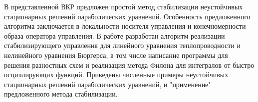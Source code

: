 \Conclusion
\vspace{2em}

В представленной ВКР предложен простой метод стабилизации неустойчивых
стационарных решений параболических уравнений. Особенность предложенного
алгоритма заключается в локальности носителя управления и конечномерности образа
оператора управления. В работе разработан алгоритм реализации стабилизирующего
управления для линейного уравнения теплопроводности и нелинейного уравнения
Бюргерса, в том числе написание программы для решения разностных схем и
реализация метода Филона для интегралов от быстро осциллирующих функций.
Приведены численные примеры неустойчивых стационарных решений параболических
уравнений, и "применение" предложенного метода стабилизации.
